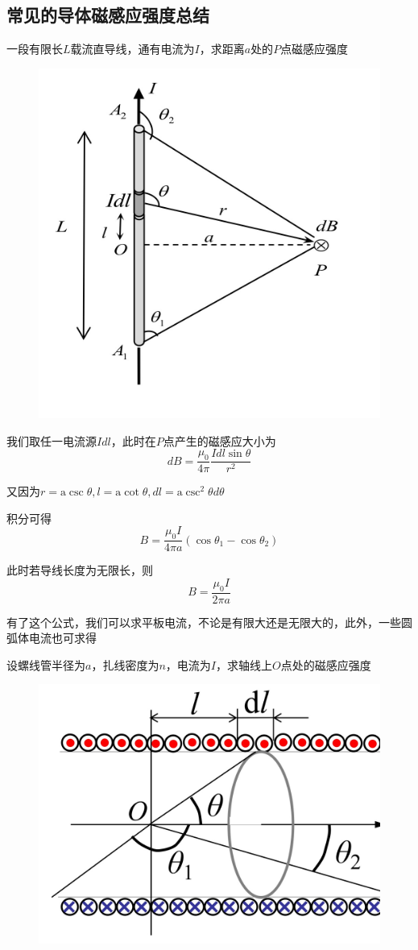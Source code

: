 \documentclass[lang=cn,10pt]{elegantbook}
\begin{document}
	\subsection{常见的导体磁感应强度总结}
	\begin{example}
		一段有限长$L$载流直导线，通有电流为$I$，求距离$a$处的$P$点磁感应强度
\begin{figure}[H]
	\centering
	\includegraphics[width=0.18\linewidth]{image/IMG_0425(20231121-204507)}
	\caption{}
	\label{fig:img042520231121-204507}
\end{figure}
	\end{example}
	\begin{solution}
		我们取任一电流源$Idl$，此时在$P$点产生的磁感应大小为
		\begin{equation*}
			dB=\frac{\mu _0}{4\pi}\frac{Idl\sin \theta}{r^2}
		\end{equation*}
		
		又因为$r=\mathrm{a}\csc \theta ,l=\mathrm{a}\cot \theta ,dl=\mathrm{a}\csc ^2\theta d\theta $
		
		积分可得
		\begin{equation*}
			B=\frac{\mu _0 I}{4\pi a}\left( \cos \theta _1-\cos \theta _2 \right)
		\end{equation*}
	\end{solution}
	\begin{note}
		此时若导线长度为无限长，则
		\begin{equation*}
			B=\frac{\mu _0 I}{2\pi a}
		\end{equation*}
	\end{note}
	\begin{remark}
		有了这个公式，我们可以求平板电流，不论是有限大还是无限大的，此外，一些圆弧体电流也可求得
	\end{remark}
	\begin{example}
		设螺线管半径为$a$，扎线密度为$ n$，电流为$I$，求轴线上$O$点处的磁感应强度
		\begin{figure}[H]
	\centering
	\includegraphics[width=0.18\linewidth]{image/IMG_0426(20231121-204759)}
	\caption{}
	\label{fig:img042620231121-204759}
\end{figure}
	\end{example}
\end{document}
